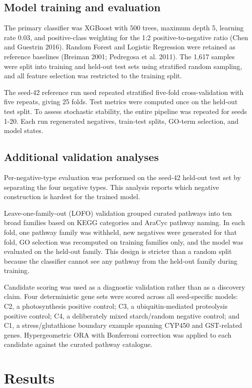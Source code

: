 \documentclass[11pt]{article}
\begin{document}
\subsection{Model training and evaluation}
The primary classifier was XGBoost with 500 trees, maximum depth 5, learning rate 0.03, and positive-class weighting for the 1:2 positive-to-negative ratio (Chen and Guestrin 2016). Random Forest and Logistic Regression were retained as reference baselines (Breiman 2001; Pedregosa et al. 2011). The 1,617 samples were split into training and held-out test sets using stratified random sampling, and all feature selection was restricted to the training split.

The seed-42 reference run used repeated stratified five-fold cross-validation with five repeats, giving 25 folds. Test metrics were computed once on the held-out test split. To assess stochastic stability, the entire pipeline was repeated for seeds 1-20. Each run regenerated negatives, train-test splits, GO-term selection, and model states.

\subsection{Additional validation analyses}
Per-negative-type evaluation was performed on the seed-42 held-out test set by separating the four negative types. This analysis reports which negative construction is hardest for the trained model.

Leave-one-family-out (LOFO) validation grouped curated pathways into ten broad families based on KEGG categories and AraCyc pathway naming. In each fold, one pathway family was withheld, new negatives were generated for that fold, GO selection was recomputed on training families only, and the model was evaluated on the held-out family. This design is stricter than a random split because the classifier cannot see any pathway from the held-out family during training.

Candidate scoring was used as a diagnostic validation rather than as a discovery claim. Four deterministic gene sets were scored across all seed-specific models: C2, a photosynthesis positive control; C3, a ubiquitin-mediated proteolysis positive control; C4, a deliberately mixed starch/random negative control; and C1, a stress/glutathione boundary example spanning CYP450 and GST-related genes. Hypergeometric ORA with Bonferroni correction was applied to each candidate against the curated pathway catalogue.

\section{Results}
\end{document}
